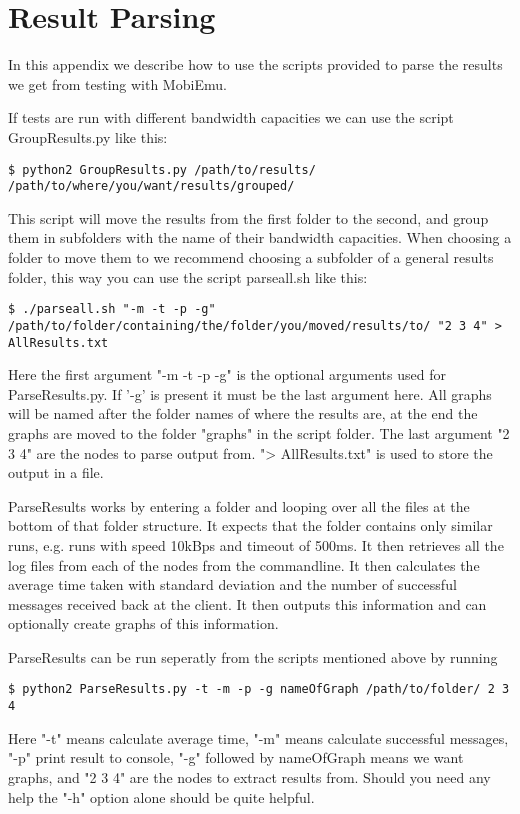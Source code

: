 \section{Result Parsing}\label{Result Parsing}
    In this appendix we describe how to use the scripts provided to parse the results we get from testing with MobiEmu.
    
    If tests are run with different bandwidth capacities we can use the script GroupResults.py like this:
    \lstset{language=bash, style=shell}
    \begin{lstlisting}
$ python2 GroupResults.py /path/to/results/ /path/to/where/you/want/results/grouped/
    \end{lstlisting}
    This script will move the results from the first folder to the second, and group them in subfolders with the name of their bandwidth capacities. When choosing a folder to move them to we recommend choosing a subfolder of a general results folder, this way you can use the script parseall.sh like this:
    \begin{lstlisting}
$ ./parseall.sh "-m -t -p -g" /path/to/folder/containing/the/folder/you/moved/results/to/ "2 3 4" > AllResults.txt
    \end{lstlisting}
    Here the first argument "-m -t -p -g" is the optional arguments used for ParseResults.py. If '-g' is present it must be the last argument here. All graphs will be named after the folder names of where the results are, at the end the graphs are moved to the folder "graphs" in the script folder. The last argument "2 3 4" are the nodes to parse output from. "> AllResults.txt" is used to store the output in a file.
    
    ParseResults works by entering a folder and looping over all the files at the bottom of that folder structure. It expects that the folder contains only similar runs, e.g. runs with speed 10kBps and timeout of 500ms. It then retrieves all the log files from each of the nodes from the commandline. It then calculates the average time taken with standard deviation and the number of successful messages received back at the client. It then outputs this information and can optionally create graphs of this information.
    
    ParseResults can be run seperatly from the scripts mentioned above by running
    \begin{lstlisting}
$ python2 ParseResults.py -t -m -p -g nameOfGraph /path/to/folder/ 2 3 4
    \end{lstlisting}
    Here "-t" means calculate average time, "-m" means calculate successful messages, "-p" print result to console, "-g" followed by nameOfGraph means we want graphs, and "2 3 4" are the nodes to extract results from. Should you need any help the "-h" option alone should be quite helpful.

